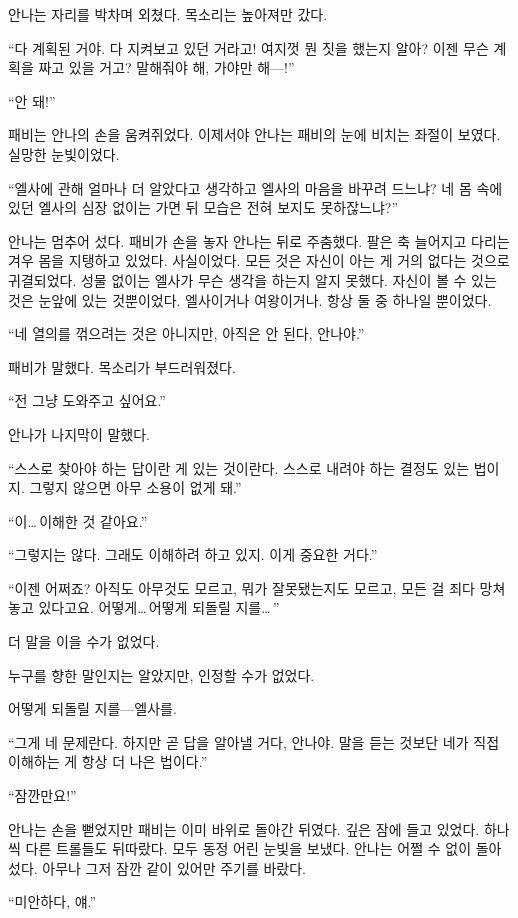 안나는 자리를 박차며 외쳤다. 목소리는 높아져만 갔다.

``다 계획된 거야. 다 지켜보고 있던 거라고! 여지껏 뭔 짓을 했는지 알아? 이젠 무슨 계획을 짜고 있을 거고? 말해줘야 해, 가야만 해—!''

``안 돼!''

패비는 안나의 손을 움켜쥐었다. 이제서야 안나는 패비의 눈에 비치는 좌절이 보였다. 실망한 눈빛이었다.

``엘사에 관해 얼마나 더 알았다고 생각하고 엘사의 마음을 바꾸려 드느냐? 네 몸 속에 있던 엘사의 심장 없이는 가면 뒤 모습은 전혀 보지도 못하잖느냐?''

안나는 멈추어 섰다. 패비가 손을 놓자 안나는 뒤로 주춤했다. 팔은 축 늘어지고 다리는 겨우 몸을 지탱하고 있었다. 사실이었다. 모든 것은 자신이 아는 게 거의 없다는 것으로 귀결되었다. 성물 없이는 엘사가 무슨 생각을 하는지 알지 못했다. 자신이 볼 수 있는 것은 눈앞에 있는 것뿐이었다. 엘사이거나 여왕이거나. 항상 둘 중 하나일 뿐이었다.

``네 열의를 꺾으려는 것은 아니지만, 아직은 안 된다, 안나야.''

패비가 말했다. 목소리가 부드러워졌다.

``전 그냥 도와주고 싶어요.''

안나가 나지막이 말했다.

``스스로 찾아야 하는 답이란 게 있는 것이란다. 스스로 내려야 하는 결정도 있는 법이지. 그렇지 않으면 아무 소용이 없게 돼.''

``이\ldots\,이해한 것 같아요.''

``그렇지는 않다. 그래도 이해하려 하고 있지. 이게 중요한 거다.''

``이젠 어쩌죠? 아직도 아무것도 모르고, 뭐가 잘못됐는지도 모르고, 모든 걸 죄다 망쳐놓고 있다고요. 어떻게\ldots\,어떻게 되돌릴 지를\ldots\,''

더 말을 이을 수가 없었다.

누구를 향한 말인지는 알았지만, 인정할 수가 없었다.

어떻게 되돌릴 지를—엘사를.

``그게 네 문제란다. 하지만 곧 답을 알아낼 거다, 안나야. 말을 듣는 것보단 네가 직접 이해하는 게 항상 더 나은 법이다.''

``잠깐만요!''

안나는 손을 뻗었지만 패비는 이미 바위로 돌아간 뒤였다. 깊은 잠에 들고 있었다. 하나씩 다른 트롤들도 뒤따랐다. 모두 동정 어린 눈빛을 보냈다. 안나는 어쩔 수 없이 돌아섰다. 아무나 그저 잠깐 같이 있어만 주기를 바랐다.

``미안하다, 얘.''

